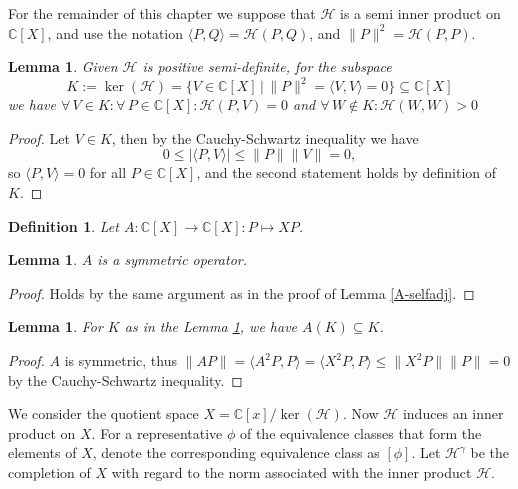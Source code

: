 \documentclass[12pt,oneside]{report}
\newtheorem{lem}[thm]{Lemma}
\newtheorem{defn}[thm]{Definition}
\begin{document}
For the remainder of this chapter we suppose that $\mathcal{H}$ is a semi inner product on $\mathbb{C}[X]$, and use the notation $\langle P, Q \rangle = \mathcal{H}(P,Q)$, and $\|P\|^{2} = \mathcal{H}(P,P)$.

\begin{lem}\label{subspaceK}
    Given $\mathcal{H}$ is positive semi-definite, for the subspace
    $$K := \ker(\mathcal{H}) = \{ V \in \mathbb{C}[X] \, | \, \|P\|^{2} = \langle V, V \rangle = 0 \} \subseteq \mathbb{C}[X]$$
    we have $\forall \, V \in K: \forall \, P \in \mathbb{C}[X]: \mathcal{H}(P,V) = 0$ and $\forall \, W \notin K: \mathcal{H}(W,W) > 0$
\end{lem}
\begin{proof}
    Let $V \in K$, then by the Cauchy-Schwartz inequality we have
    $$0 \leq |\langle P, V \rangle| \leq \|P\|\|V\| = 0,$$
    so $\langle P, V \rangle = 0$ for all $P \in \mathbb{C}[X]$, and the second statement holds by definition of $K$.
\end{proof}

\begin{defn}
    Let $A: \mathbb{C}[X] \to \mathbb{C}[X]: P \mapsto XP$.
\end{defn}

\begin{lem}\label{A-symm}
    $A$ is a symmetric operator. %
\end{lem}
\begin{proof}
    Holds by the same argument as in the proof of Lemma \ref{A-selfadj}.
\end{proof}

\begin{lem}
    For $K$ as in the Lemma \ref{subspaceK}, we have $A(K) \subseteq K$.
\end{lem}
\begin{proof}
    $A$ is symmetric, thus
    $\|AP\| = \langle A^{2}P, P \rangle = \langle X^{2}P, P \rangle \leq \|X^{2}P\|\|P\| = 0$
    by the Cauchy-Schwartz inequality.
\end{proof}

We consider the quotient space $X = \mathbb{C}[x]/\ker(\mathcal{H})$. Now $\mathcal{H}$ induces an inner product on $X$. For a representative $\phi$ of the equivalence classes that form the elements of $X$, denote the corresponding equivalence class as $[\phi]$. Let $\mathscr{H}^{\gamma}$ be the completion of $X$ with regard to the norm associated with the inner product $\mathcal{H}$.
\end{document}
